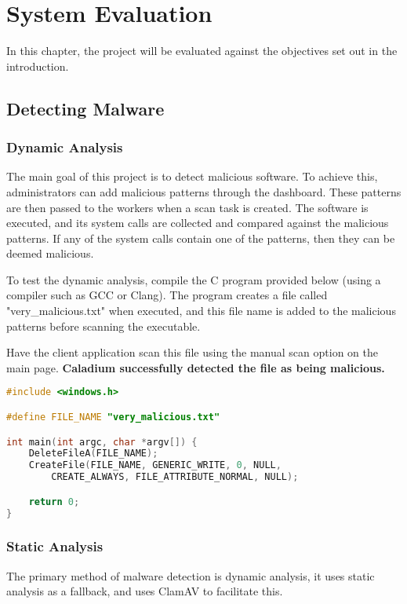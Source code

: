 \chapter{System Evaluation}

In this chapter, the project will be evaluated against the
objectives set out in the introduction.

\section{Detecting Malware}
\subsection{Dynamic Analysis}
The main goal of this project is to detect malicious software.
To achieve this, administrators can add malicious patterns through the dashboard.
These patterns are then passed to the workers when a scan task is created.
The software is executed, and its system calls are collected
and compared against the malicious patterns.
If any of the system calls contain one of the patterns,
then they can be deemed malicious.

To test the dynamic analysis, compile the C program provided below
(using a compiler such as GCC or Clang).
The program creates a file called "very\_malicious.txt" when executed,
and this file name is added to the malicious patterns
before scanning the executable.

Have the client application scan this file using
the manual scan option on the main page.
\textbf{Caladium successfully detected the file as being malicious.}

\begin{lstlisting}[language=C]
#include <windows.h>

#define FILE_NAME "very_malicious.txt"

int main(int argc, char *argv[]) {
    DeleteFileA(FILE_NAME);
    CreateFile(FILE_NAME, GENERIC_WRITE, 0, NULL,
        CREATE_ALWAYS, FILE_ATTRIBUTE_NORMAL, NULL);

    return 0;
}
\end{lstlisting}

\subsection{Static Analysis}
The primary method of malware detection is dynamic analysis,
it uses static analysis as a fallback,
and uses ClamAV to facilitate this.

